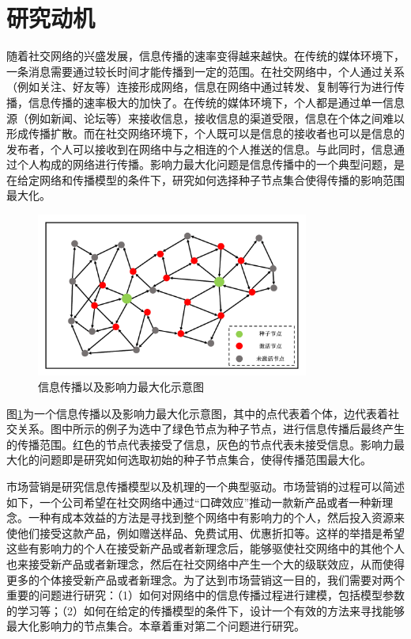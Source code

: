\section{研究动机}
\label{3sec:motivation}
随着社交网络的兴盛发展，信息传播的速率变得越来越快。在传统的媒体环境下，一条消息需要通过较长时间才能传播到一定的范围。在社交网络中，个人通过关系（例如关注、好友等）连接形成网络，信息在网络中通过转发、复制等行为进行传播，信息传播的速率极大的加快了。在传统的媒体环境下，个人都是通过单一信息源（例如新闻、论坛等）来接收信息，接收信息的渠道受限，信息在个体之间难以形成传播扩散。而在社交网络环境下，个人既可以是信息的接收者也可以是信息的发布者，个人可以接收到在网络中与之相连的个人推送的信息。与此同时，信息通过个人构成的网络进行传播。影响力最大化问题是信息传播中的一个典型问题，是在给定网络和传播模型的条件下，研究如何选择种子节点集合使得传播的影响范围最大化。
\begin{figure}[!ht]
    \centering
    \includegraphics[width=0.8\textwidth]{figures/infoDiffExp.pdf}
    \caption{信息传播以及影响力最大化示意图}
    \label{fig:infoDiffExp}
\end{figure}

图\ref{fig:infoDiffExp}为一个信息传播以及影响力最大化示意图，其中的点代表着个体，边代表着社交关系。图中所示的例子为选中了绿色节点为种子节点，进行信息传播后最终产生的传播范围。红色的节点代表接受了信息，灰色的节点代表未接受信息。影响力最大化的问题即是研究如何选取初始的种子节点集合，使得传播范围最大化。

市场营销是研究信息传播模型以及机理的一个典型驱动。市场营销的过程可以简述如下，一个公司希望在社交网络中通过“口碑效应”推动一款新产品或者一种新理念。一种有成本效益的方法是寻找到整个网络中有影响力的个人，然后投入资源来使他们接受这款产品，例如赠送样品、免费试用、优惠折扣等。这样的举措是希望这些有影响力的个人在接受新产品或者新理念后，能够驱使社交网络中的其他个人也来接受新产品或者新理念，然后在社交网络中产生一个大的级联效应，从而使得更多的个体接受新产品或者新理念。为了达到市场营销这一目的，我们需要对两个重要的问题进行研究：（1）如何对网络中的信息传播过程进行建模，包括模型参数的学习等；（2）如何在给定的传播模型的条件下，设计一个有效的方法来寻找能够最大化影响力的节点集合。本章着重对第二个问题进行研究。

